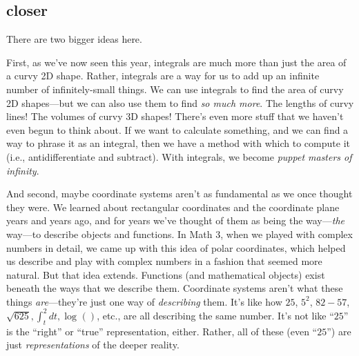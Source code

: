\documentclass[
]{article}
\begin{document}
\hypertarget{closer}{%
\subsection{closer}\label{closer}}

There are two bigger ideas here.

First, as we've now seen this year, integrals are much more than just the area of a curvy 2D shape. Rather, integrals are a way for us to add up an infinite number of infinitely-small things. We can use integrals to find the area of curvy 2D shapes---but we can also use them to find \emph{so much more}. The lengths of curvy lines! The volumes of curvy 3D shapes! There's even more stuff that we haven't even begun to think about. If we want to calculate something, and we can find a way to phrase it as an integral, then we have a method with which to compute it (i.e., antidifferentiate and subtract). With integrals, we become \emph{puppet masters of infinity}.

And second, maybe coordinate systems aren't as fundamental as we once thought they were. We learned about rectangular coordinates and the coordinate plane years and years ago, and for years we've thought of them as being the way---\emph{the} way---to describe objects and functions. In Math 3, when we played with complex numbers in detail, we came up with this idea of polar coordinates, which helped us describe and play with complex numbers in a fashion that seemed more natural. But that idea extends. Functions (and mathematical objects) exist beneath the ways that we describe them. Coordinate systems aren't what these things \emph{are}---they're just one way of \emph{describing} them. It's like how \(25\), \(5^2\), \(82-57\), \(\sqrt{625}, \int_ t^2 dt, \log_{}\left( \right)\), etc., are all describing the same number. It's not like ``\(25\)'' is the ``right'' or ``true'' representation, either. Rather, all of these (even ``\(25\)'') are just \emph{representations} of the deeper reality.
\end{document}
